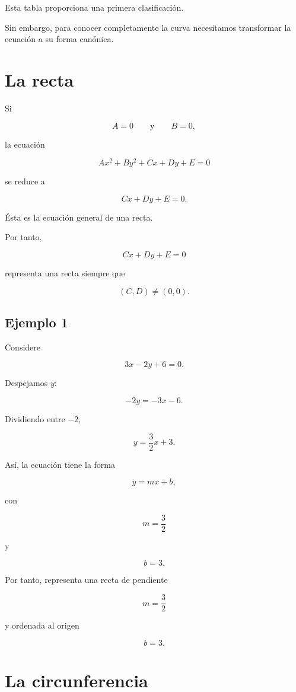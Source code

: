 \documentclass[12pt]{article}
\begin{document}
{Esta tabla proporciona una primera clasificación.

Sin embargo, para conocer completamente la curva necesitamos transformar
la ecuación a su forma canónica.

\section{La recta}

Si

\[
A=0
\qquad\text{y}\qquad
B=0,
\]

la ecuación

\[
Ax^2+By^2+Cx+Dy+E=0
\]

se reduce a

\[
Cx+Dy+E=0.
\]

Ésta es la ecuación general de una recta.

Por tanto,

\[
\boxed{
Cx+Dy+E=0
}
\]

representa una recta siempre que

\[
(C,D)\neq(0,0).
\]

\subsection{Ejemplo 1}

Considere

\[
3x-2y+6=0.
\]

Despejamos \(y\):

\[
-2y=-3x-6.
\]

Dividiendo entre \(-2\),

\[
y=\frac32x+3.
\]

Así, la ecuación tiene la forma

\[
y=mx+b,
\]

con

\[
m=\frac32
\]

y

\[
b=3.
\]

Por tanto, representa una recta de pendiente

\[
\boxed{m=\frac32}
\]

y ordenada al origen

\[
\boxed{b=3}.
\]

\section{La circunferencia}

}
\end{document}
